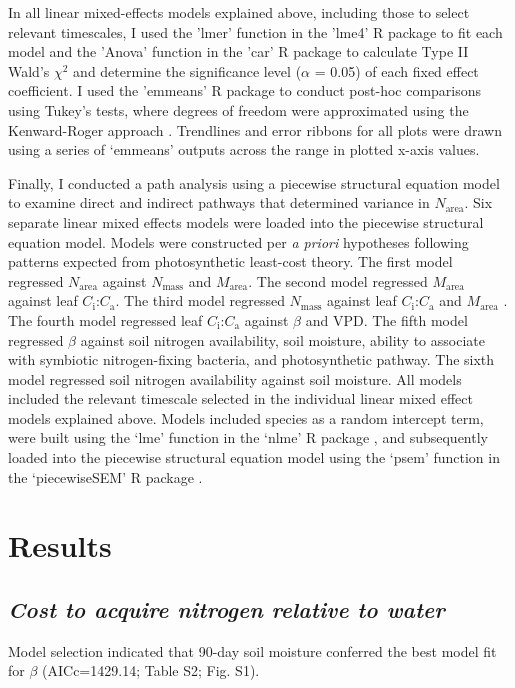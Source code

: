 In all linear mixed-effects models explained above, including those to select relevant timescales, I used the 'lmer' function in the 'lme4' R package  to fit each model and the 'Anova' function in the 'car' R package  to calculate Type II Wald's $\chi^2$ and determine the significance level ($\alpha$ = 0.05) of each fixed effect coefficient. I used the 'emmeans' R package  to conduct post-hoc comparisons using Tukey's tests, where degrees of freedom were approximated using the Kenward-Roger approach . Trendlines and error ribbons for all plots were drawn using a series of ‘emmeans’ outputs across the range in plotted x-axis values.

Finally, I conducted a path analysis using a piecewise structural equation model to examine direct and indirect pathways that determined variance in $N_\mathrm{area}$. Six separate linear mixed effects models were loaded into the piecewise structural equation model. Models were constructed per \textit{a priori} hypotheses following patterns expected from photosynthetic least-cost theory. The first model regressed $N_\mathrm{area}$ against $N_\mathrm{mass}$ and $M_\mathrm{area}$. The second model regressed $M_\mathrm{area}$ against leaf $C_\mathrm{i}$:$C_\mathrm{a}$. The third model regressed $N_\mathrm{mass}$ against leaf $C_\mathrm{i}$:$C_\mathrm{a}$ and $M_\mathrm{area}$ . The fourth model regressed leaf $C_\mathrm{i}$:$C_\mathrm{a}$ against $\beta$ and VPD. The fifth model regressed $\beta$ against soil nitrogen availability, soil moisture, ability to associate with symbiotic nitrogen-fixing bacteria, and photosynthetic pathway. The sixth model regressed soil nitrogen availability against soil moisture. All models included the relevant timescale selected in the individual linear mixed effect models explained above. Models included species as a random intercept term, were built using the ‘lme’ function in the ‘nlme’ R package , and subsequently loaded into the piecewise structural equation model using the ‘psem’ function in the ‘piecewiseSEM’ R package .

\section{Results}
\subsection{\textit{Cost to acquire nitrogen relative to water}}
\noindent Model selection indicated that 90-day soil moisture conferred the best model fit for $\beta$ (AICc=1429.14; Table S2; Fig. S1).

